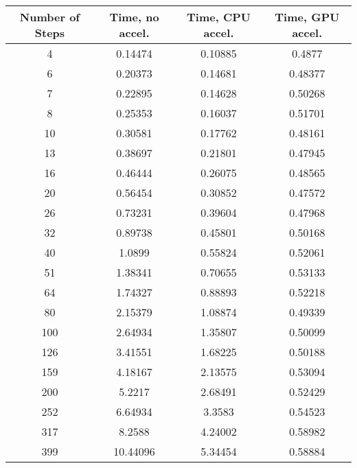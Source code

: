 \begin{table}[ht!]
    \centering
    {\footnotesize
        \begin{tabular}{| c | c c c |}
            \hline
            Number of Steps  & Time, no accel.  & Time, CPU accel. &  Time, GPU accel. \\
            \hline
            4    &    0.14474    &    0.10885    &    0.4877    \\
            6    &    0.20373    &    0.14681    &    0.48377    \\
            7    &    0.22895    &    0.14628    &    0.50268    \\
            8    &    0.25353    &    0.16037    &    0.51701    \\
            10    &    0.30581    &    0.17762    &    0.48161    \\
            13    &    0.38697    &    0.21801    &    0.47945    \\
            16    &    0.46444    &    0.26075    &    0.48565    \\
            20    &    0.56454    &    0.30852    &    0.47572    \\
            26    &    0.73231    &    0.39604    &    0.47968    \\
            32    &    0.89738    &    0.45801    &    0.50168    \\
            40    &    1.0899    &    0.55824    &    0.52061    \\
            51    &    1.38341    &    0.70655    &    0.53133    \\
            64    &    1.74327    &    0.88893    &    0.52218    \\
            80    &    2.15379    &    1.08874    &    0.49339    \\
            100    &    2.64934    &    1.35807    &    0.50099    \\
            126    &    3.41551    &    1.68225    &    0.50188    \\
            159    &    4.18167    &    2.13575    &    0.53094    \\
            200    &    5.2217    &    2.68491    &    0.52429    \\
            252    &    6.64934    &    3.3583    &    0.54523    \\
            317    &    8.2588    &    4.24002    &    0.58982    \\
            399    &    10.44096    &    5.34454    &    0.58884    \\

\end{tabular}}
\end{table}
